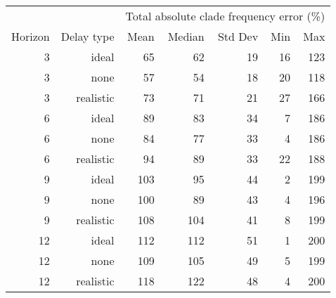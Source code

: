 
\begin{tabular*}{0.7\textwidth}{rrrrrrr}
\toprule
        &            & \multicolumn{5}{c}{Total absolute clade frequency error (\%)} \\
Horizon & Delay type & Mean & Median & Std Dev & Min & Max \\
\midrule

3 & ideal & 65 & 62 & 19 & 16 & 123 \\
3 & none & 57 & 54 & 18 & 20 & 118 \\
3 & realistic & 73 & 71 & 21 & 27 & 166 \\
6 & ideal & 89 & 83 & 34 & 7 & 186 \\
6 & none & 84 & 77 & 33 & 4 & 186 \\
6 & realistic & 94 & 89 & 33 & 22 & 188 \\
9 & ideal & 103 & 95 & 44 & 2 & 199 \\
9 & none & 100 & 89 & 43 & 4 & 196 \\
9 & realistic & 108 & 104 & 41 & 8 & 199 \\
12 & ideal & 112 & 112 & 51 & 1 & 200 \\
12 & none & 109 & 105 & 49 & 5 & 199 \\
12 & realistic & 118 & 122 & 48 & 4 & 200 \\

\bottomrule
\end{tabular*}


